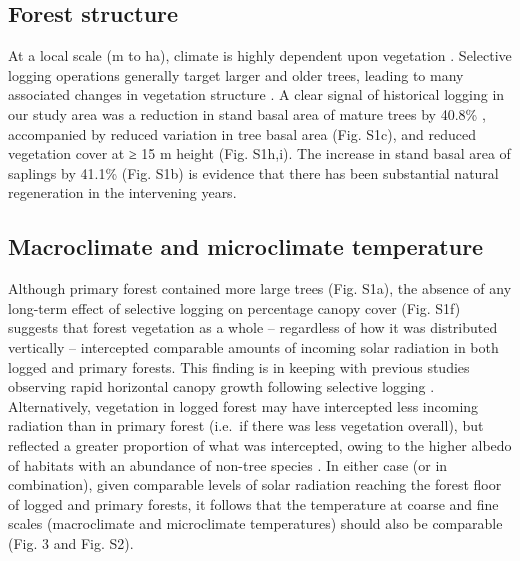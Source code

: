 \documentclass[12pt,a4paper,]{report}
\theoremstyle{definition}
\theoremstyle{definition}
\theoremstyle{definition}
\theoremstyle{remark}
\begin{document}
\subsection{Forest structure}\label{forest-structure-2}

At a local scale (m to ha), climate is highly dependent upon vegetation
\citep{oke_boundary1987, sears_world2011}. Selective logging operations
generally target larger and older trees, leading to many associated
changes in vegetation structure
\citep{okuda_effect2003, kumar_effects2005, edwards_maintaining2014}. A
clear signal of historical logging in our study area was a reduction in
stand basal area of mature trees by 40.8\% \citep[Fig.
S1a;][]{berry_impacts2008}, accompanied by reduced variation in tree
basal area (Fig. S1c), and reduced vegetation cover at ≥ 15 m height
(Fig. S1h,i). The increase in stand basal area of saplings by 41.1\%
(Fig. S1b) is evidence that there has been substantial natural
regeneration in the intervening years.

\subsection{Macroclimate and microclimate
temperature}\label{macroclimate-and-microclimate-temperature-1}

Although primary forest contained more large trees (Fig. S1a), the
absence of any long-term effect of selective logging on percentage
canopy cover (Fig. S1f) suggests that forest vegetation as a whole --
regardless of how it was distributed vertically -- intercepted
comparable amounts of incoming solar radiation in both logged and
primary forests. This finding is in keeping with previous studies
observing rapid horizontal canopy growth following selective logging
\citep[e.g.][]{asner_canopy2004}. Alternatively, vegetation in logged
forest may have intercepted less incoming radiation than in primary
forest (i.e.~if there was less vegetation overall), but reflected a
greater proportion of what was intercepted, owing to the higher albedo
of habitats with an abundance of non-tree species
\citep{oke_boundary1987, davin_climatic2010, edwards_maintaining2014}.
In either case (or in combination), given comparable levels of solar
radiation reaching the forest floor of logged and primary forests, it
follows that the temperature at coarse and fine scales (macroclimate and
microclimate temperatures) should also be comparable (Fig. 3 and Fig.
S2).
\end{document}
